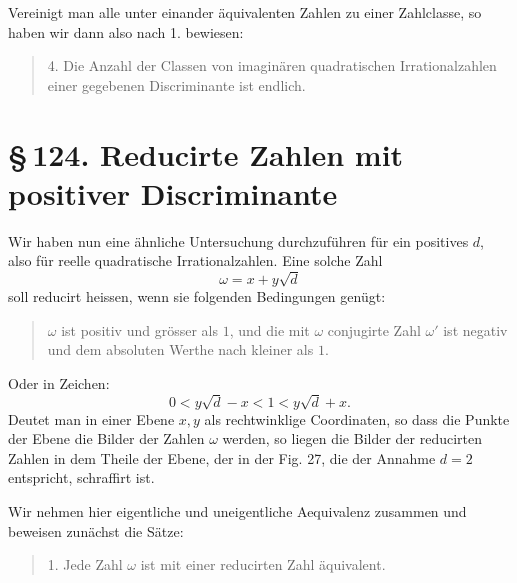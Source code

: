 \documentclass[11pt]{article}
\providecommand{\sect}[2]{\section*{\S\,#1. #2}}
\begin{document}
Vereinigt man alle unter einander äquivalenten Zahlen zu einer Zahlclasse, so haben wir dann also nach 1. bewiesen:
\begin{quote}
4. Die Anzahl der Classen von imaginären quadratischen Irrationalzahlen einer gegebenen Discriminante ist endlich.
\end{quote}





\sect{124}{Reducirte Zahlen mit positiver Discriminante}

Wir haben nun eine ähnliche Untersuchung durchzuführen für ein positives $d$, also für reelle quadratische Irrationalzahlen. Eine solche Zahl
\[
        \omega=x+y\sqrt d
\]
soll reducirt heissen, wenn sie folgenden Bedingungen genügt:
\begin{quote}
$\omega$ ist positiv und grösser als $1$, und die mit $\omega$ conjugirte Zahl $\omega'$ ist negativ und dem absoluten Werthe nach kleiner als $1$.
\end{quote}
Oder in Zeichen:
\[
\tag{1}        0<y\sqrt d-x<1<y\sqrt d+x.
\]
Deutet man in einer Ebene $x,y$ als rechtwinklige Coordinaten, so dass die Punkte der Ebene die Bilder der Zahlen $\omega$ werden, so liegen die Bilder der reducirten Zahlen in dem Theile der Ebene, der in der Fig. 27, die der Annahme $d=2$ entspricht, schraffirt ist.

\begin{figure}[h]
\centering
{}
\par{}
\end{figure}

Wir nehmen hier eigentliche und uneigentliche Aequivalenz zusammen und beweisen zunächst die Sätze:

\begin{quote}
1. Jede Zahl $\omega$ ist mit einer reducirten Zahl äquivalent.
\end{quote}
\end{document}
